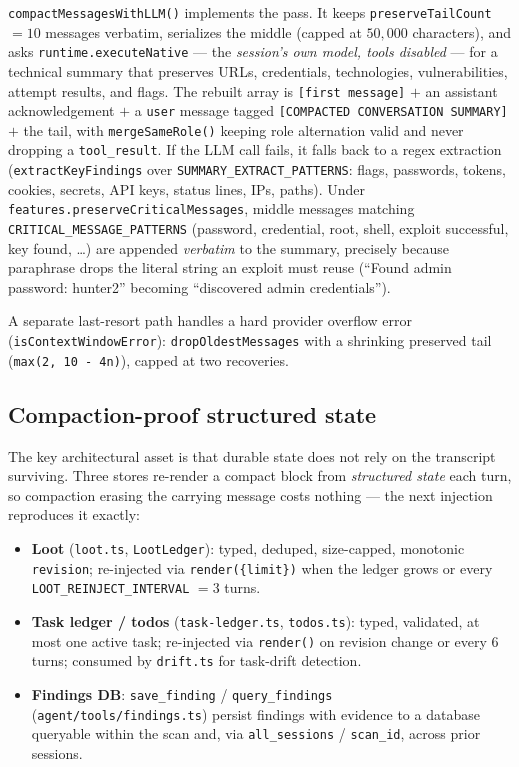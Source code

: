 \documentclass[11pt]{article}
\begin{document}
\texttt{compactMessagesWithLLM()} implements the pass. It keeps
\texttt{preserveTailCount} $=10$ messages verbatim, serializes the middle (capped
at $50{,}000$ characters), and asks \texttt{runtime.executeNative} --- the
\emph{session's own model, tools disabled} --- for a technical summary that
preserves URLs, credentials, technologies, vulnerabilities, attempt results, and
flags. The rebuilt array is \texttt{[first message]} $+$ an assistant
acknowledgement $+$ a \texttt{user} message tagged \texttt{[COMPACTED
CONVERSATION SUMMARY]} $+$ the tail, with \texttt{mergeSameRole()} keeping role
alternation valid and never dropping a \texttt{tool\_result}. If the LLM call
fails, it falls back to a regex extraction (\texttt{extractKeyFindings} over
\texttt{SUMMARY\_EXTRACT\_PATTERNS}: flags, passwords, tokens, cookies, secrets,
API keys, status lines, IPs, paths). Under \texttt{features.preserveCriticalMessages},
middle messages matching \texttt{CRITICAL\_MESSAGE\_PATTERNS} (password,
credential, root, shell, exploit successful, key found, \dots) are appended
\emph{verbatim} to the summary, precisely because paraphrase drops the literal
string an exploit must reuse (``Found admin password: hunter2'' becoming
``discovered admin credentials'').

A separate last-resort path handles a hard provider overflow error
(\texttt{isContextWindowError}): \texttt{dropOldestMessages} with a shrinking
preserved tail (\texttt{max(2, 10 - 4n)}), capped at two recoveries.

\subsection{Compaction-proof structured state}

The key architectural asset is that durable state does not rely on the
transcript surviving. Three stores re-render a compact block from
\emph{structured state} each turn, so compaction erasing the carrying message
costs nothing --- the next injection reproduces it exactly:

\begin{itemize}[leftmargin=1.4em]
\item \textbf{Loot} (\texttt{loot.ts}, \texttt{LootLedger}): typed, deduped,
size-capped, monotonic \texttt{revision}; re-injected via \texttt{render(\{limit\})}
when the ledger grows or every \texttt{LOOT\_REINJECT\_INTERVAL} $=3$ turns.
\item \textbf{Task ledger / todos} (\texttt{task-ledger.ts},
\texttt{todos.ts}): typed, validated, at most one active task; re-injected via
\texttt{render()} on revision change or every $6$ turns; consumed by
\texttt{drift.ts} for task-drift detection.
\item \textbf{Findings DB}: \texttt{save\_finding} / \texttt{query\_findings}
(\texttt{agent/tools/findings.ts}) persist findings with evidence to a database
queryable within the scan and, via \texttt{all\_sessions} / \texttt{scan\_id},
across prior sessions.
\end{itemize}
\end{document}
